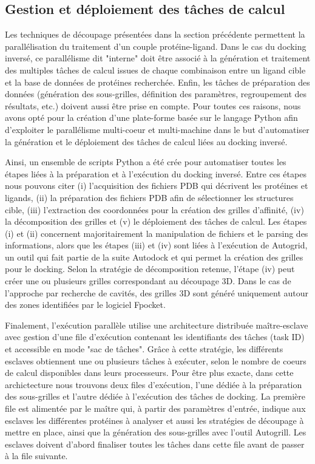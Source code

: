 \subsection{Gestion et déploiement des tâches de calcul}

Les techniques de découpage présentées dans la section précédente permettent la parallélisation du traitement d'un couple protéine-ligand. Dans le cas du docking inversé, ce parallélisme dit "interne" doit être associé à la génération et traitement des multiples tâches de calcul issues de chaque combinaison entre un ligand cible et la base de données de protéines recherchée. Enfin, les tâches de préparation des données (génération des sous-grilles, définition des paramètres, regroupement des résultats, etc.) doivent aussi être prise en compte. Pour toutes ces raisons, nous avons opté pour la création d'une plate-forme basée sur le langage Python afin d'exploiter le parallélisme multi-coeur et multi-machine dans le but d'automatiser la génération et le déploiement des tâches de calcul liées au docking inversé.

Ainsi, un ensemble de scripts Python a été crée pour automatiser toutes les étapes liées à la préparation et à l'exécution du docking inversé. Entre ces étapes nous pouvons citer (i) l'acquisition des fichiers PDB qui décrivent les protéines et ligands, (ii) la préparation des fichiers PDB afin de sélectionner les structures cible, (iii) l'extraction des coordonnées pour la création des grilles d'affinité, (iv) la décomposition des grilles et (v) le déploiement des tâches de calcul. Les étapes (i) et (ii) concernent majoritairement la manipulation de fichiers et le parsing des informations, alors que les étapes  (iii) et (iv) sont liées à l'exécution de Autogrid, un outil qui fait partie de la suite Autodock et qui permet la création des grilles pour le docking. Selon la stratégie de décomposition retenue, l'étape (iv) peut créer une ou plusieurs grilles correspondant au découpage 3D. Dans le cas de l'approche par recherche de cavités, des grilles 3D sont généré uniquement autour des zones identifiées par le logiciel Fpocket. 

Finalement, l'exécution parallèle utilise une architecture distribuée maître-esclave avec gestion d'une file d'exécution contenant les identifiants des tâches (task ID) et accessible en mode "sac de tâches". Grâce à cette stratégie, les différents esclaves obtiennent une ou plusieurs tâches à exécuter, selon le nombre de coeurs de calcul disponibles dans leurs processeurs.
Pour être plus exacte, dans cette archictecture nous trouvons deux files d'exécution, l'une dédiée à la préparation des sous-grilles et l'autre dédiée à l'exécution des tâches de docking. La première file est alimentée par le maître qui, à partir des paramètres d'entrée, indique aux esclaves les différentes protéines à analyser et aussi les stratégies de découpage à mettre en place, ainsi que la génération des sous-grilles avec l'outil Autogrill. Les esclaves doivent d'abord finaliser toutes les tâches dans cette file avant de passer à la file suivante.

